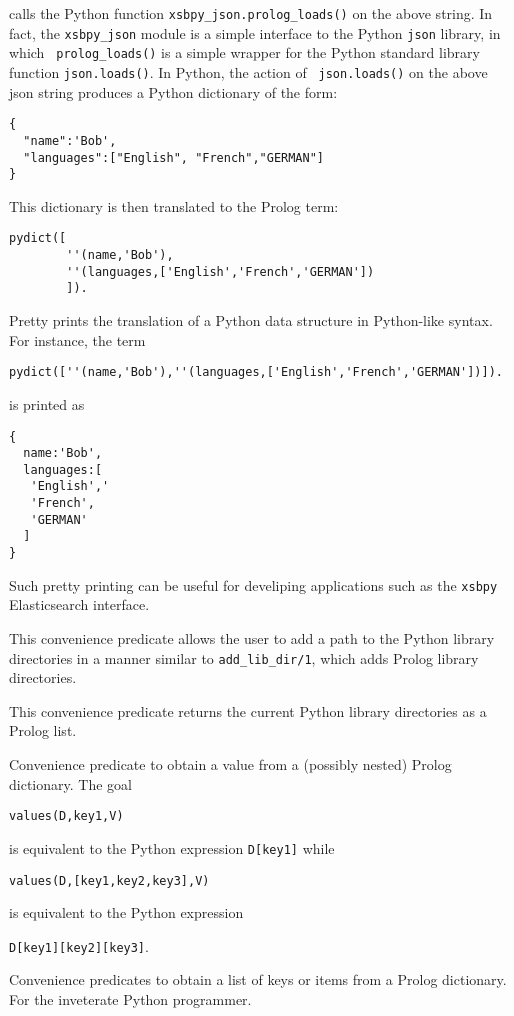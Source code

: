 \begin{description}
\noindent 
calls the Python function {\tt xsbpy\_json.prolog\_loads()} on the
above string.  In fact, the {\tt xsbpy\_json} module is a simple
interface to the Python {\tt json} library, in which {\tt
  prolog\_loads()} is a simple wrapper for the Python standard library
function {\tt json.loads()}.  In Python, the action of {\tt
  json.loads()} on the above json string produces a Python dictionary
of the form:
\begin{verbatim}
{
  "name":'Bob',
  "languages":["English", "French","GERMAN"]
}
\end{verbatim}
This dictionary is then translated to the Prolog term:
\begin{verbatim}
pydict([
        ''(name,'Bob'),
        ''(languages,['English','French','GERMAN'])
        ]).
\end{verbatim}


Pretty prints the translation of a Python data structure in
Python-like syntax.  For instance, the term

\begin{verbatim}
pydict([''(name,'Bob'),''(languages,['English','French','GERMAN'])]).
\end{verbatim}

\noindent
is printed as 
\begin{verbatim}
{
  name:'Bob',
  languages:[
   'English','
   'French',
   'GERMAN'
  ]
}
\end{verbatim}

Such pretty printing can be useful for develiping applications such as
the {\tt xsbpy} Elasticsearch interface.

%
This convenience predicate allows the user to add a path to the Python
library directories in a manner similar to {\tt add\_lib\_dir/1},
which adds Prolog library directories.

%
This convenience predicate returns the current Python library
directories as a Prolog list.

%
  Convenience predicate to obtain a value from a (possibly nested)
  Prolog dictionary.  The goal

  {\tt values(D,key1,V)}

\noindent
  is equivalent to the
  Python expression {\tt D[key1]} while

  {\tt values(D,[key1,key2,key3],V)}

\noindent
is equivalent to the Python expression

{\tt D[key1][key2][key3]}.

%
Convenience predicates to obtain a list of keys or items from a Prolog
dictionary.  For the inveterate Python programmer.

\end{description}

